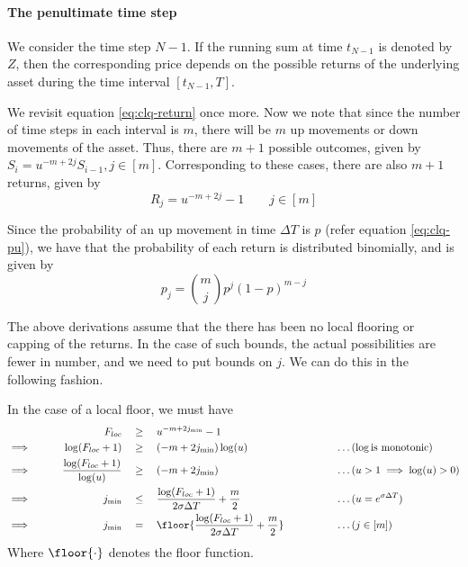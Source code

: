 \paragraph{The penultimate time step}

We consider the time step $ N - 1 $. If the running sum at time $ t_{N - 1} $ is denoted by $ Z $, then the corresponding price depends on the possible returns of the underlying asset during the time interval $ [ t_{N - 1}, T ] $.

We revisit equation \ref{eq:clq-return} once more. Now we note that since the number of time steps in each interval is $m$, there will be $m$ up movements or down movements of the asset. Thus, there are $ m + 1 $ possible outcomes, given by $ S_i = u^{-m + 2j} S_{i-1}, j \in [m] $. Corresponding to these cases, there are also $ m + 1 $ returns, given by
\begin{equation}
	\label{eq:clq-return-final}
	R_j = u^{-m + 2j} - 1 \qquad j \in [m]
\end{equation}

Since the probability of an up movement in time $ \Delta T $ is $p$ (refer equation \ref{eq:clq-pu}), we have that the probability of each return is distributed binomially, and is given by
\begin{equation}
	\label{eq:clq-prb-binom}
	p_j = \binom{m}{j} p^j (1-p)^{m-j}
\end{equation}

The above derivations assume that the there has been no local flooring or capping of the returns. In the case of such bounds, the actual possibilities are fewer in number, and we need to put bounds on $j$. We can do this in the following fashion.

In the case of a local floor, we must have
\begin{alignat*}{9}
	                 &&  F_{loc}  \quad & \ge \quad  u^{ -m + 2 j_{\min} } - 1 && \\
	\implies  \qquad &&  \log(F_{loc} + 1)  \quad & \ge \quad  ( -m + 2 j_{\min} ) \log(u)  &&  \qquad \qquad \dots (\log \text{is monotonic}) \\
	\implies  \qquad &&  \frac{\log(F_{loc} + 1)}{\log(u)}  \quad & \ge \quad  ( -m + 2 j_{\min} )  &&  \qquad \qquad \dots (u > 1 \implies \log(u) > 0) \\
	\implies  \qquad &&  j_{\min}  \quad & \le \quad  \frac{ \log(F_{loc} + 1) }{ 2 \sigma \Delta T } + \frac{m}{2}  &&  \qquad \qquad \dots (u = e^{ \sigma \Delta T }) \\
	\implies  \qquad &&  j_{\min}  \quad & = \quad  \floor{ \frac{ \log(F_{loc} + 1) }{ 2 \sigma \Delta T } + \frac{m}{2} }  &&  \qquad \qquad \dots (j \in [m]) \\
\end{alignat*}
Where $ \floor{\cdot} $ denotes the floor function.

